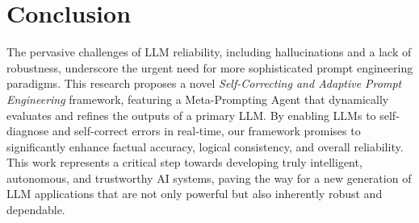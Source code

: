 \documentclass{article}
\begin{document}
\section{Conclusion}
The pervasive challenges of LLM reliability, including hallucinations and a lack of robustness, underscore the urgent need for more sophisticated prompt engineering paradigms. This research proposes a novel \textit{Self-Correcting and Adaptive Prompt Engineering} framework, featuring a Meta-Prompting Agent that dynamically evaluates and refines the outputs of a primary LLM. By enabling LLMs to self-diagnose and self-correct errors in real-time, our framework promises to significantly enhance factual accuracy, logical consistency, and overall reliability. This work represents a critical step towards developing truly intelligent, autonomous, and trustworthy AI systems, paving the way for a new generation of LLM applications that are not only powerful but also inherently robust and dependable.


\end{document}
